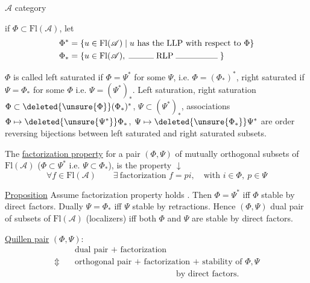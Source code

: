 
$\mathscr A$ category

if $\Phi\subset\mathrm{Fl}(\mathscr A)$, let
\[
\begin{aligned}
\Phi^*&=\{u\in\mathrm{Fl}(\mathscr A)\mid u\text{ has the LLP with respect to }\Phi\}\\
\Phi_*&=\{u\in\mathrm{Fl}(\mathscr A),\;\rule{3em}{.3pt}\;\mathrm{RLP}\;\rule{5em}{.3pt}\;\}
\end{aligned}
\]

$\Phi$ is called left saturated if $\Phi=\Psi^*$ for some $\Psi$, i.e. $\Phi=(\Phi_*)^*$, \inserted{$\Psi$} right saturated if  $\Psi=\Phi_*$ for some $\Phi$ i.e. $\Psi=(\Psi^*)_*$. Left saturation, right saturation $\Phi\subset\deleted{\unsure{\Phi}}(\Phi_*)^*$, $\Psi\subset(\Psi^*)_*$, associations $\Phi\mapsto\deleted{\unsure{\Psi^*}}\Phi_*$, $\Psi\mapsto\deleted{\unsure{\Phi_*}}\Psi^*$ are order reversing bijections between left saturated and right saturated subsets.

The \uline{factorization property} for a pair $(\Phi,\Psi)$ of mutually orthogonal subsets of $\mathrm{Fl}(\mathscr A)$ ($\Phi\subset\Psi^*$ i.e. $\Psi\subset\Phi_*$), is the property  $\downarrow$
\[
\forall f\in\mathrm{Fl}(\mathscr A)\qquad \exists\ \text{factorization }f=pi,\quad\text{with }i\in\Phi,\ p\in\Psi
\]


 \uline{Proposition} Assume factorization property holds . Then $\Phi=\Psi^*$ iff $\Phi$ stable by direct factors. Dually $\Psi=\Phi_*$ iff $\Psi$ stable by retractions. Hence $(\Phi,\Psi)$  dual pair of subsets of $\mathrm{Fl}(\mathscr A)$ (localizers) iff   both $\Phi$ and $\Psi$ are stable by direct factors.

\uline{Quillen pair} $(\Phi,\Psi)$:
\[
\begin{aligned}
 &\text{dual pair + factorization}\\
\Updownarrow\quad&\text{orthogonal pair + factorization + stability of }\Phi,\Psi\\
 &\hspace{12em}\text{by direct factors.}
\end{aligned}
\]

